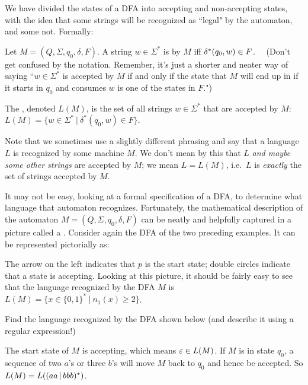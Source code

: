 \smallskip

We have divided the states of a DFA into accepting and non-accepting states, with
the idea that some strings will be recognized as ``legal" by the automaton, and
some not.  Formally:

\begin{definition}
Let $M=(Q, \Sigma, q_0, \delta, F)$.  A string $w \in \Sigma^*$ is 
by $M$ iff $\delta^*(q_0, w) \in F$. \ \ (Don't get confused by the notation.  
Remember, it's just a shorter and neater way of saying
``$w \in \Sigma^*$ is accepted by $M$ if and only if the state that $M$ will end
up in
if it starts in $q_0$ and consumes $w$ is one of the states in $F$.")

The , denoted $L(M)$, is the set of all strings 
$w \in \Sigma^*$ that are accepted by $M$: 
$L(M) = \{ w \in\Sigma^* \ | \ \delta^*(q_0, w) \in F\}$.

\end{definition}

\smallskip
Note that we sometimes use a slightly different phrasing and say that a language
$L$ is recognized by some machine $M$.  We don't mean by this that $L$ {\em and
maybe some other strings} are accepted by $M$; we mean $L = L(M)$, i.e.\ $L$ is
{\em exactly} the set of strings accepted by $M$.

It may not be easy, looking at a formal specification of a DFA, to determine what
language that automaton recognizes.  Fortunately, the mathematical description of
the automaton $M=(Q, \Sigma, q_0, \delta, F)$ can be neatly and helpfully
captured in a picture called a .  
Consider again the DFA of the two preceding examples.  It
can be represented pictorially as:


\noindent The arrow on the left indicates that $p$ is the start state; double
circles indicate that a state is accepting.  Looking at this picture, it should
be fairly easy to see that the language recognized by the DFA $M$ is 
$L(M) = \{ x \in \{0,1\}^* \ | \ n_1(x) \geq 2\}$.

\begin{example}
Find the language recognized by the DFA shown below (and describe it using a
regular expression!)


The start state of $M$ is accepting, which means $\varepsilon \in L(M)$.  If $M$ is
in state $q_0$, a
sequence of two $a$'s or three $b$'s will move $M$ back to $q_0$ and hence
be accepted.  So $L(M) = L((aa\hbox{$\,|\,$} bbb)^*)$.
\end{example}

